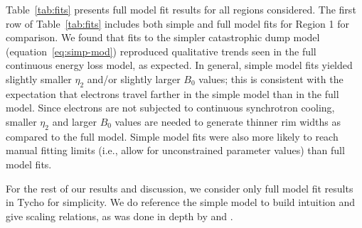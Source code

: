 \documentclass[iop, apj, numberedappendix, twocolappendix]{emulateapj}
\begin{document}

Table~\ref{tab:fits} presents full model fit results for all regions
considered.  The first row of Table~\ref{tab:fits} includes both simple and
full model fits for Region 1 for comparison.  We found that fits to the simpler
catastrophic dump model (equation~\eqref{eq:simp-mod}) reproduced qualitative
trends seen in the full continuous energy loss model, as expected.  In general,
simple model fits yielded slightly smaller $\eta_2$ and/or slightly larger
$B_0$ values; this is consistent with the expectation that electrons travel
farther in the simple model than in the full model. Since electrons are not
subjected to continuous synchrotron cooling, smaller $\eta_2$ and larger $B_0$
values are needed to generate thinner rim widths as compared to the full model.
Simple model fits were also more likely to reach manual fitting limits (i.e.,
allow for unconstrained parameter values) than full model fits.

For the rest of our results and discussion, we consider only full model
fit results in Tycho for simplicity.  We do reference the simple model to build
intuition and give scaling relations, as was done in depth by
\citet{parizot2006} and .
\end{document}
